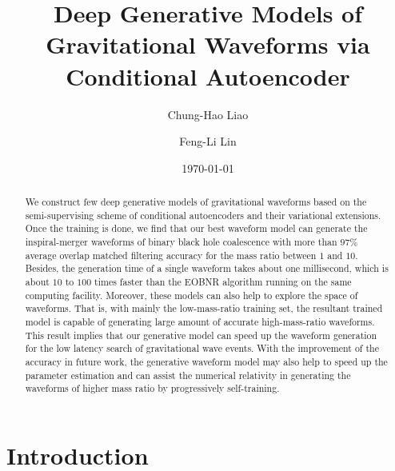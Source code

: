 \documentclass[twocolumn,prd,superscriptaddress,nofootinbib]{revtex4-1}
\begin{document}
\title{Deep Generative Models of Gravitational Waveforms via Conditional Autoencoder}


\author{Chung-Hao Liao}

\author{Feng-Li Lin}



\date{\today}

\begin{abstract}
We construct few deep generative models of gravitational waveforms based on the semi-supervising scheme of conditional autoencoders and their variational extensions. Once the training is done, we find that our best waveform model can generate the inspiral-merger waveforms of binary black hole coalescence with more than $97\%$ average overlap matched filtering accuracy for the mass ratio between $1$ and $10$. Besides, the generation time of a single waveform takes about one millisecond, which is about $10$ to $100$ times faster than the EOBNR algorithm running on the same computing facility. Moreover, these models can also help to explore the space of waveforms. That is, with mainly the low-mass-ratio training set, the resultant trained model is capable of generating large amount of accurate high-mass-ratio waveforms. This result implies that our generative model can speed up the waveform generation for the low latency search of gravitational wave events. With the improvement of the accuracy in future work, the generative waveform model may also help to speed up the parameter estimation and can assist the numerical relativity in generating the waveforms of higher mass ratio by progressively self-training.
\end{abstract}
 
\maketitle

\section{Introduction}\label{Introduction}
\end{document}
